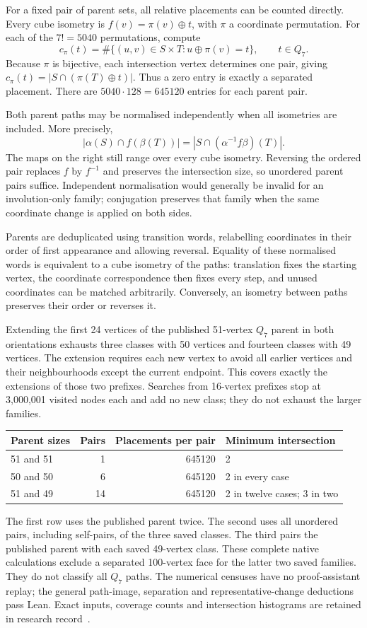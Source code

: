 \documentclass[11pt,a4paper]{article}
\theoremstyle{definition}
\theoremstyle{remark}
\begin{document}
For a fixed pair of parent sets, all relative placements can be counted
directly. Every cube isometry is $f(v)=\pi(v)\oplus t$, with $\pi$ a
coordinate permutation. For each of the $7!=5040$ permutations, compute
\[
c_\pi(t)=\#\{(u,v)\in S\times T:u\oplus\pi(v)=t\},
\qquad t\in Q_7.
\]
Because $\pi$ is bijective, each intersection vertex determines one
pair, giving $c_\pi(t)=|S\cap(\pi(T)\oplus t)|$. Thus a zero entry is
exactly a separated placement. There are $5040\cdot128=645120$ entries
for each parent pair.

Both parent paths may be normalised independently when all isometries
are included. More precisely,
\[
|\alpha(S)\cap f(\beta(T))|
=|S\cap(\alpha^{-1}f\beta)(T)|.
\]
The maps on the right still range over every cube isometry.
Reversing the ordered pair replaces $f$ by $f^{-1}$ and preserves the
intersection size, so unordered parent pairs suffice. Independent
normalisation would generally be invalid for an involution-only family;
conjugation preserves that family when the same coordinate change is
applied on both sides.

Parents are deduplicated using transition words, relabelling coordinates
in their order of first appearance and allowing reversal. Equality of
these normalised words is equivalent to a cube isometry of the paths:
translation fixes the starting vertex, the coordinate correspondence
then fixes every step, and unused coordinates can be matched arbitrarily.
Conversely, an isometry between paths preserves their order or reverses it.

Extending the first 24 vertices of the published 51-vertex $Q_7$ parent
in both orientations exhausts three classes with 50 vertices and fourteen
classes with 49 vertices. The extension requires each new vertex to avoid
all earlier vertices and their neighbourhoods except the current endpoint.
This covers exactly the extensions of those two prefixes. Searches from
16-vertex prefixes stop at 3,000,001 visited nodes each and add no new class;
they do not exhaust the larger families.

\begin{center}
\begin{tabular}{lrrl}
\toprule
Parent sizes & Pairs & Placements per pair & Minimum intersection\\
\midrule
51 and 51 & 1 & 645120 & 2\\
50 and 50 & 6 & 645120 & 2 in every case\\
51 and 49 & 14 & 645120 & 2 in twelve cases; 3 in two\\
\bottomrule
\end{tabular}
\end{center}
The first row uses the published parent twice. The second uses all
unordered pairs, including self-pairs, of the three saved classes.
The third pairs the published parent with each saved 49-vertex class.
These complete native calculations exclude a separated 100-vertex face
for the latter two saved families. They do not classify all $Q_7$ paths.
The numerical censuses have no proof-assistant replay; the general
path-image, separation and representative-change deductions pass Lean.
Exact inputs, coverage counts and intersection histograms are retained
in research record~\cite{research199}.
\end{document}
